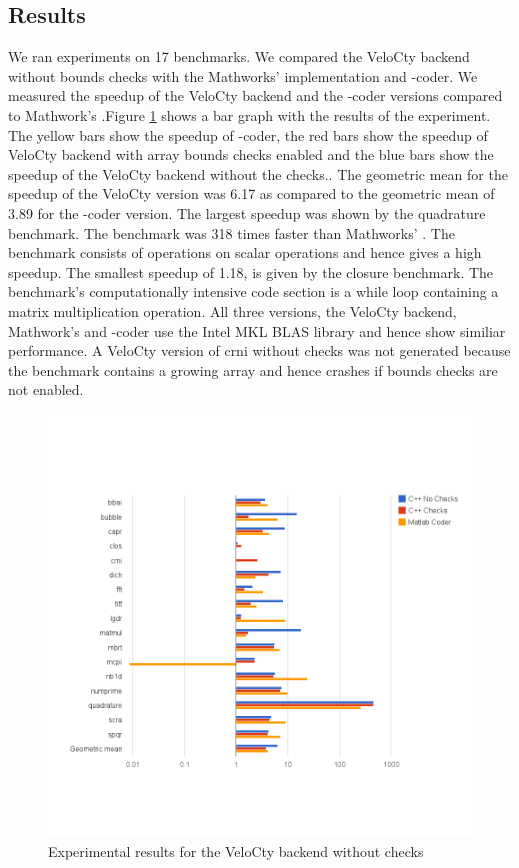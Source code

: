 \subsection{\matlab Results}
We ran experiments on 17 \matlab benchmarks. We compared the VeloCty backend without bounds checks with the Mathworks' \matlab implementation and \matlab-coder. We measured the speedup of the VeloCty backend and the \matlab-coder versions compared to  Mathwork's \matlab.Figure \ref{fig:results_cwochecks} shows a bar graph with the results of the experiment. The yellow bars show the speedup of \matlab-coder, the red bars show the speedup of VeloCty backend with array bounds checks enabled and the blue bars show the speedup of the VeloCty backend without the checks.. The geometric mean for the speedup of the VeloCty version was 6.17 as compared to the geometric mean of 3.89 for the \matlab-coder version. The largest speedup was shown by the quadrature benchmark. The benchmark was 318 times faster than Mathworks' \matlab. The benchmark consists of operations on scalar operations and hence gives a high speedup. The smallest speedup of 1.18, is given by the closure benchmark. The benchmark's computationally intensive code section is a while loop containing a matrix multiplication operation. All three versions, the VeloCty backend, Mathwork's \matlab and \matlab-coder use the Intel MKL BLAS library and hence show similiar performance. A VeloCty version of crni without checks was not generated because the benchmark contains a growing array and hence crashes if bounds checks are not enabled. 
\begin{figure}[htbp]
\centering
\includegraphics[scale=0.5]{Figures/results_cwochecks.png}
\caption{Experimental results for the VeloCty backend without checks}
\label{fig:results_cwochecks}
\end{figure}

